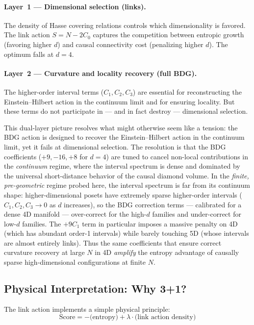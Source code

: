 \documentclass[12pt,a4paper]{article}
\begin{document}
\paragraph{Layer~1 --- Dimensional selection (links).}
The density of Hasse covering relations controls which dimensionality is favored.
The link action $S = N - 2C_0$ captures the competition between entropic growth
(favoring higher $d$) and causal connectivity cost (penalizing higher $d$).
The optimum falls at $d = 4$.

\paragraph{Layer~2 --- Curvature and locality recovery (full BDG).}
The higher-order interval terms ($C_1, C_2, C_3$) are essential for reconstructing the
Einstein--Hilbert action in the continuum limit and for ensuring locality.
But these terms do not participate in --- and in fact destroy --- dimensional selection.

This dual-layer picture resolves what might otherwise seem like a tension:
the BDG action is designed to recover the Einstein--Hilbert action in the continuum
limit, yet it fails at dimensional selection.  The resolution is that the BDG
coefficients ($+9, -16, +8$ for $d{=}4$) are tuned to cancel non-local contributions
in the \emph{continuum} regime, where the interval spectrum is dense and dominated
by the universal short-distance behavior of the causal diamond volume.
In the \emph{finite, pre-geometric} regime probed here, the interval spectrum is far
from its continuum shape: higher-dimensional posets have extremely sparse
higher-order intervals ($C_1, C_2, C_3 \to 0$ as $d$ increases),
so the BDG correction terms --- calibrated for a dense 4D manifold --- over-correct
for the high-$d$ families and under-correct for low-$d$ families.
The $+9C_1$ term in particular imposes a massive penalty on 4D (which has abundant
order-1 intervals) while barely touching 5D (whose intervals are almost entirely links).
Thus the same coefficients that ensure correct curvature recovery at large $N$ in 4D
\emph{amplify} the entropy advantage of causally sparse high-dimensional configurations
at finite $N$.

\subsection{Physical Interpretation: Why 3+1?}
\label{sec:why_31}

The link action implements a simple physical principle:
\begin{equation}
\mathrm{Score} = -\text{(entropy)} + \lambda \cdot \text{(link action density)}
\end{equation}
\end{document}
